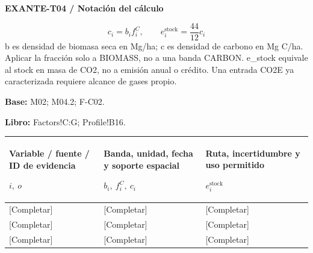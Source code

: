 \par\begingroup\sffamily\fontsize{8}{10}\selectfont\color{NEBGreen}\setlength{\parskip}{2pt}\setlength{\abovedisplayskip}{4pt}\setlength{\belowdisplayskip}{4pt}\setlength{\abovedisplayshortskip}{2pt}\setlength{\belowdisplayshortskip}{3pt}
\textbf{EXANTE-T04 / Notación del cálculo}\par
{\fontsize{9}{11}\selectfont\[ c_i=b_i f_i^C,\qquad e_i^{\mathrm{stock}}=\frac{44}{12}c_i \]}
b es densidad de biomasa seca en Mg/ha; c es densidad de carbono en Mg C/ha. Aplicar la fracción solo a BIOMASS, no a una banda CARBON. e\_stock equivale al stock en masa de CO2, no a emisión anual o crédito. Una entrada CO2E ya caracterizada requiere alcance de gases propio.\par
\textbf{Base:} M02; M04.2; F-C02.\par
\textbf{Libro:} Factors!C:G; Profile!B16.\par\endgroup
{\sffamily\fontsize{8.3}{10.3}\selectfont\begin{longtable}{@{}P{54.83mm} P{54.83mm} P{54.83mm}@{}}
\toprule
\textbf{Variable / fuente / ID de evidencia}\par {\normalfont\fontsize{8.2}{10}\selectfont $i,\ o$} & \textbf{Banda, unidad, fecha y soporte espacial}\par {\normalfont\fontsize{8.2}{10}\selectfont $b_i,\ f_i^C,\ c_i$} & \textbf{Ruta, incertidumbre y uso permitido}\par {\normalfont\fontsize{8.2}{10}\selectfont $e_i^{\mathrm{stock}}$}\\\midrule\endhead
\rule{0pt}{8mm}[Completar] & [Completar] & [Completar]\\\hline
\rule{0pt}{8mm}[Completar] & [Completar] & [Completar]\\\hline
\rule{0pt}{8mm}[Completar] & [Completar] & [Completar]\\\hline
\end{longtable}}
